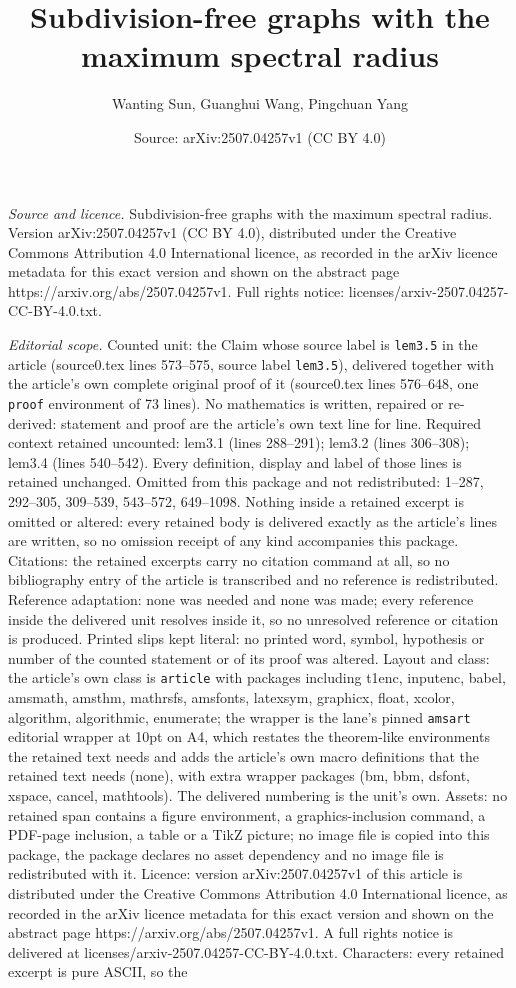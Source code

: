 \documentclass[10pt,a4paper]{amsart}
\title[Subdivision-free graphs with the maximum spectral radius]{Subdivision-free graphs with the maximum spectral radius}
\author{Wanting Sun, Guanghui Wang, Pingchuan Yang}
\date{Source: arXiv:2507.04257v1 (CC BY 4.0)}
\begin{document}
\maketitle

\noindent\emph{Source and licence.} Subdivision-free graphs with the maximum spectral radius. Version arXiv:2507.04257v1 (CC BY 4.0), distributed under the Creative Commons Attribution 4.0 International licence, as recorded in the arXiv licence metadata for this exact version and shown on the abstract page https://arxiv.org/abs/2507.04257v1. Full rights notice: licenses/arxiv-2507.04257-CC-BY-4.0.txt.\par\smallskip

\noindent\textit{Editorial scope.} Counted unit: the Claim whose source label is \texttt{lem3.5} in the article (source0.tex lines 573--575, source label \texttt{lem3.5}), delivered together with the article's own complete original proof of it (source0.tex lines 576--648, one \texttt{proof} environment of 73 lines). No mathematics is written, repaired or re-derived: statement and proof are the article's own text line for line. Required context retained uncounted: lem3.1 (lines 288--291); lem3.2 (lines 306--308); lem3.4 (lines 540--542). Every definition, display and label of those lines is retained unchanged. Omitted from this package and not redistributed: 1--287, 292--305, 309--539, 543--572, 649--1098. Nothing inside a retained excerpt is omitted or altered: every retained body is delivered exactly as the article's lines are written, so no omission receipt of any kind accompanies this package. Citations: the retained excerpts carry no citation command at all, so no bibliography entry of the article is transcribed and no reference is redistributed. Reference adaptation: none was needed and none was made; every reference inside the delivered unit resolves inside it, so no unresolved reference or citation is produced. Printed slips kept literal: no printed word, symbol, hypothesis or number of the counted statement or of its proof was altered. Layout and class: the article's own class is \texttt{article} with packages including t1enc, inputenc, babel, amsmath, amsthm, mathrsfs, amsfonts, latexsym, graphicx, float, xcolor, algorithm, algorithmic, enumerate; the wrapper is the lane's pinned \texttt{amsart} editorial wrapper at 10pt on A4, which restates the theorem-like environments the retained text needs and adds the article's own macro definitions that the retained text needs (none), with extra wrapper packages (bm, bbm, dsfont, xspace, cancel, mathtools). The delivered numbering is the unit's own. Assets: no retained span contains a figure environment, a graphics-inclusion command, a PDF-page inclusion, a table or a TikZ picture; no image file is copied into this package, the package declares no asset dependency and no image file is redistributed with it. Licence: version arXiv:2507.04257v1 of this article is distributed under the Creative Commons Attribution 4.0 International licence, as recorded in the arXiv licence metadata for this exact version and shown on the abstract page https://arxiv.org/abs/2507.04257v1. A full rights notice is delivered at licenses/arxiv-2507.04257-CC-BY-4.0.txt. Characters: every retained excerpt is pure ASCII, so the 
\end{document}
